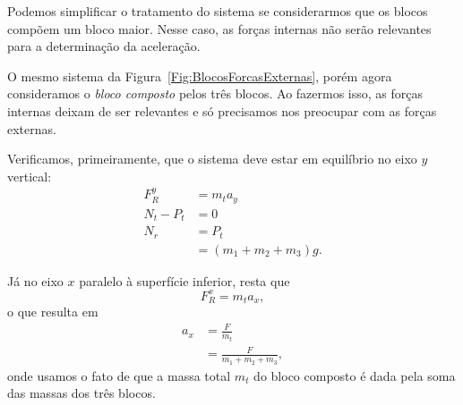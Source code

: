 Podemos simplificar o tratamento do sistema se considerarmos que os blocos compõem um bloco maior. Nesse caso, as forças internas não serão relevantes para a determinação da aceleração.

\begin{marginfigure}[2cm]
\centering
{}
\caption{O mesmo sistema da Figura~\ref{Fig:BlocosForcasExternas}, porém agora consideramos o \emph{bloco composto} pelos três blocos. Ao fazermos isso, as forças internas deixam de ser relevantes e só precisamos nos preocupar com as forças externas.\label{Fig:BlocosForcasExternasComposto}}
\end{marginfigure}

Verificamos, primeiramente, que o sistema deve estar em equilíbrio no eixo $y$ vertical: 
\begin{align}
    F_R^y &= m_t a_y \\
    N_t - P_t &= 0 \\
    N_r &= P_t \\
    &= (m_1 + m_2 + m_3) g.
\end{align}

Já no eixo $x$ paralelo à superfície inferior, resta que
\begin{equation}
    F_R^x = m_t a_x,
 \end{equation}
 o que resulta em
\begin{align}
    a_x &= \frac{F}{m_t} \\
    &= \frac{F}{m_1 + m_2 + m_3},
\end{align}
%
onde usamos o fato de que a massa total $m_t$ do bloco composto é dada pela soma das massas dos três blocos.

